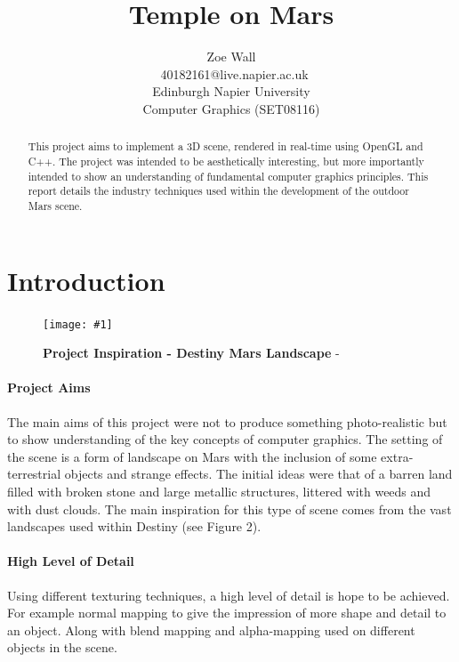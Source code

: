\documentclass[conference]{acmsiggraph}
\title{Temple on Mars}
\author{Zoe Wall \\\ 40182161@live.napier.ac.uk \\
Edinburgh Napier University \\
Computer Graphics (SET08116)}
\newcommand{\figuremacroW}[4]{
	\begin{figure}[h] %
		\centering
		\texttt{[image: \#1]}
		\caption[#2]{\textbf{#2} - #3}
		\label{fig:#1}
	\end{figure}
}
\begin{document}

\maketitle

\begin{abstract}
This project aims to implement a 3D scene, rendered in real-time using OpenGL and C++. The project was intended to be aesthetically interesting, but more importantly intended to show an understanding of fundamental computer graphics principles. This report details the industry techniques used within the development of the outdoor Mars scene.
\end{abstract}

\keywordlist

\section{Introduction}

\figuremacroW
{DestinyMars1}
{Project Inspiration - Destiny Mars Landscape}
{\protect\cite{Destiny}}
{1.0}

\paragraph{Project Aims}The main aims of this project were not to produce something photo-realistic but to show understanding of the key concepts of computer graphics. The setting of the scene is a form of landscape on Mars with the inclusion of some extra-terrestrial objects and strange effects. The initial ideas were that of a barren land filled with broken stone and large metallic structures, littered with weeds and with dust clouds. The main inspiration for this type of scene comes from the vast landscapes used within Destiny (see Figure 2).

\paragraph{High Level of Detail} Using different texturing techniques, a high level of detail is hope to be achieved. For example normal mapping to give the impression of more shape and detail to an object. Along with blend mapping and alpha-mapping used on different objects in the scene.
\end{document}
